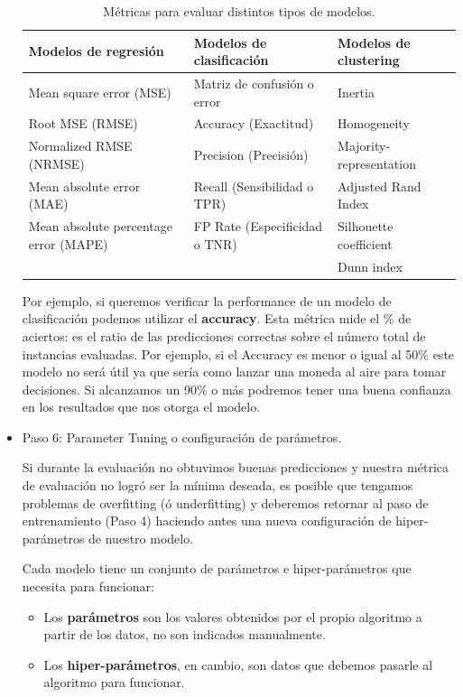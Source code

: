 \documentclass[12pt,a4paper]{article}
\begin{document}
\begin{sloppypar}
\begin{itemize}
\begin{table}[h!]
\centering
\begin{tabular}{|p{6cm}||p{5cm}||p{5cm}|}
\hline
\textbf{Modelos de regresión} & \textbf{Modelos de clasificación} & \textbf{Modelos de clustering} \\ [1ex] 
\hline
Mean square error (MSE)  & Matriz de confusión o error & Inertia \\
\hline
Root MSE (RMSE)  & Accuracy (Exactitud) & Homogeneity \\
\hline
Normalized RMSE (NRMSE)  & Precision (Precisión) & Majority-representation \\
\hline
Mean absolute error (MAE)   & Recall (Sensibilidad o TPR) & Adjusted Rand Index \\
\hline
Mean absolute percentage error (MAPE)  & FP Rate (Especificidad o TNR) & Silhouette coefficient \\
\hline
  &  &  Dunn index \\
\hline
\end{tabular}
\caption{Métricas para evaluar distintos tipos de modelos\cite{metrics_clustering_1, metrics_clustering_2,metrics_clasification,metrics_regression}.} 
\label{table:1}
\end{table}

Por ejemplo, si queremos verificar la performance de un modelo de clasificación podemos utilizar el \textbf{accuracy}. Esta métrica mide el \% de aciertos: es el ratio de las predicciones correctas sobre el número total de instancias evaluadas. Por ejemplo, si el Accuracy es menor o igual al 50\% este modelo no será útil ya que sería como lanzar una moneda al aire para tomar decisiones. Si alcanzamos un 90\% o más podremos tener una buena confianza en los resultados que nos otorga el modelo.\\

\item Paso 6: Parameter Tuning o configuración de parámetros\cite{apunte_uba}.

Si durante la evaluación no obtuvimos buenas predicciones y nuestra métrica de evaluación no logró ser la mínima deseada, es posible que tengamos problemas de overfitting (ó underfitting) y deberemos retornar al paso de entrenamiento (Paso 4) haciendo antes una nueva configuración de hiper-parámetros de nuestro modelo. 

Cada modelo tiene un conjunto de parámetros e hiper-parámetros que necesita para funcionar:
\begin{itemize}
\item Los \textbf{parámetros} son los valores obtenidos por el propio algoritmo a partir de los datos, no son indicados manualmente. 
\item Los \textbf{hiper-parámetros}, en cambio, son datos que debemos pasarle al algoritmo para funcionar. 
\end{itemize}


\end{itemize}
\end{sloppypar}
\end{document}
